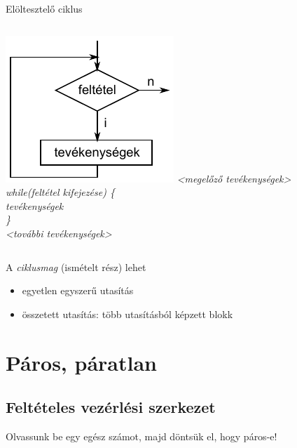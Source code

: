 \documentclass[usenames,dvipsnames,aspectratio=169]{beamer}
\begin{document}
\begin{frame}
  Elöltesztelő ciklus
  \vfill
  \begin{columns}[c]
      \hspace{0.15cm} \includegraphics{eloltesztelo.pdf}
      \emph{{<}megelőző tevékenységek>}\\
      \emph{while(feltétel kifejezése) \{} \\
      \hspace{0.5cm} \emph{tevékenységek}\\
      \emph{\}}\\
      \emph{{<}további tevékenységek>}\\
  \end{columns}
  \vfill
  A \emph{ciklusmag} (ismételt rész) lehet
  \begin{itemize}
    \item egyetlen egyszerű utasítás
    \item összetett utasítás: több utasításból képzett blokk
  \end{itemize}
\end{frame}

\section{Páros, páratlan}
\subsection{Feltételes vezérlési szerkezet}

\begin{frame}
  \small
  Olvassunk be egy egész számot, majd döntsük el, hogy páros-e!
  \begin{exampleblock}{}
    \footnotesize
    \vspace{-.2cm}
    
    \vspace{-.2cm}
  \end{exampleblock}
\end{frame}
\end{document}
